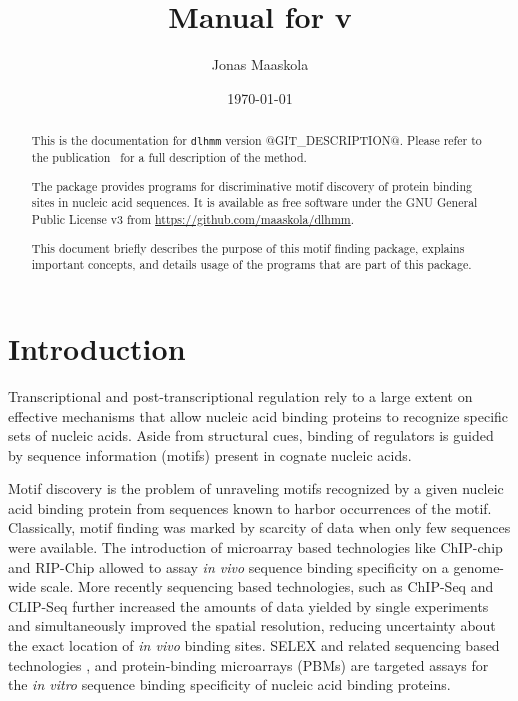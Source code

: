 \documentclass[a4paper]{article}
\title{Manual for \dlhmm{} v\version{}}
\author{Jonas Maaskola}
\date{\today}
\makeatletter
\newcommand{\dlhmm}[0]{\texttt{dlhmm}}
\newcommand{\version}[0]{@GIT_DESCRIPTION@}
\newcommand{\theurl}[0]{\url{https://github.com/maaskola/dlhmm}}
\makeatother
\begin{document}
\maketitle

\begin{abstract}
  This is the documentation for \dlhmm{} version \version{}.
  Please refer to the publication~\cite{Maaskola2013} for a full description of the method.

  The package provides programs for discriminative motif discovery of protein binding sites in nucleic acid sequences.
  It is available as free software under the GNU General Public License v3 from \theurl{}.

  This document briefly describes the purpose of this motif finding package, explains important concepts, and details usage of the programs that are part of this package.
\end{abstract}

\tableofcontents

\section{Introduction}

Transcriptional and post-transcriptional regulation rely to a large extent on effective mechanisms that allow nucleic acid binding proteins to recognize specific sets of nucleic acids.
Aside from structural cues, binding of regulators is guided by sequence information (motifs) present in cognate nucleic acids.

Motif discovery is the problem of unraveling motifs recognized by a given nucleic acid binding protein from sequences known to harbor occurrences of the motif.
Classically, motif finding was marked by scarcity of data when only few sequences were available.
The introduction of microarray based technologies like ChIP-chip \cite{Ren2000,Iyer2001} and RIP-Chip \cite{Tenenbaum2000,Keene2006} allowed to assay \textit{in vivo} sequence binding specificity on a genome-wide scale.
More recently sequencing based technologies, such as ChIP-Seq \cite{Robertson2007, Johnson2007} and CLIP-Seq \cite{Licatalosi2008,Sanford2009,Hafner2010} further increased the amounts of data yielded by single experiments and simultaneously improved the spatial resolution, reducing uncertainty about the exact location of \textit{in vivo} binding sites.
SELEX \cite{Ellington1990,Tuerk1990} and related sequencing based technologies \cite{Jolma2010}, and protein-binding microarrays (PBMs) \cite{Bulyk2001,Berger2006a} are targeted assays for the \textit{in vitro} sequence binding specificity of nucleic acid binding proteins.
\end{document}
